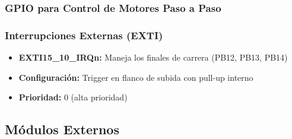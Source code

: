 \documentclass[12pt]{article}
\begin{document}
\subsubsection{GPIO para Control de Motores Paso a Paso}


\subsubsection{Interrupciones Externas (EXTI)}
\begin{itemize}
    \item \textbf{EXTI15\_10\_IRQn:} Maneja los finales de carrera (PB12, PB13, PB14)
    \item \textbf{Configuración:} Trigger en flanco de subida con pull-up interno
    \item \textbf{Prioridad:} 0 (alta prioridad)
\end{itemize}

\subsection{Módulos Externos}
\end{document}
